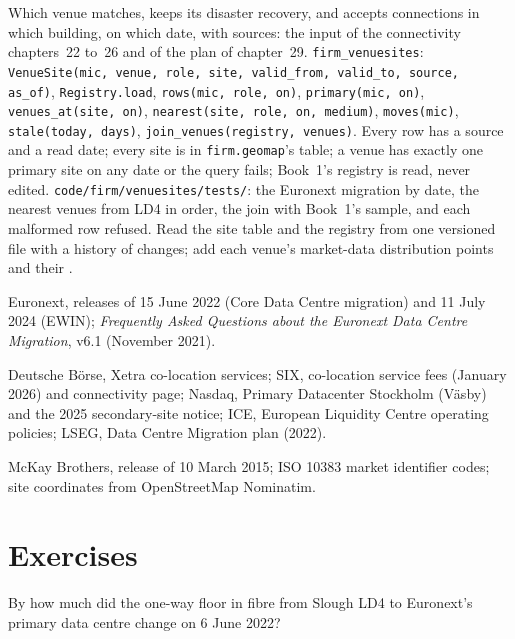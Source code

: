 \begin{build}
 Which venue matches, keeps its disaster recovery, and accepts connections in which building, on which date, with sources:
the input of the connectivity chapters~22 to~26 and of the plan of chapter~29.
 \texttt{firm\_venuesites}: \texttt{VenueSite(mic, venue, role, site, valid\_from, valid\_to, source, as\_of)},
\texttt{Registry.load}, \texttt{rows(mic, role, on)}, \texttt{primary(mic, on)}, \texttt{venues\_at(site, on)},
\texttt{nearest(site, role, on, medium)}, \texttt{moves(mic)}, \texttt{stale(today, days)}, \texttt{join\_venues(registry, venues)}.
 Every row has a source and a read date; every site is in \texttt{firm.geomap}'s table; a venue has exactly one primary site on
any date or the query fails; Book~1's registry is read, never edited.
 \texttt{code/firm/venuesites/tests/}: the Euronext migration by date, the nearest venues from LD4 in order, the
join with Book~1's sample, and each malformed row refused.
 Read the site table and the registry from one versioned file with a history of changes; add each venue's market-data
distribution points and their .
\end{build}

\begin{omsources}
\item Euronext, releases of 15 June 2022 (Core Data Centre migration) and 11 July 2024 (EWIN); \emph{Frequently Asked Questions about the
Euronext Data Centre Migration}, v6.1 (November 2021).
\item Deutsche Börse, Xetra co-location services; SIX, co-location service fees (January 2026) and connectivity page; Nasdaq, Primary
Datacenter Stockholm (Väsby) and the 2025 secondary-site notice; ICE, European Liquidity Centre operating policies; LSEG, Data Centre Migration
plan (2022).
\item McKay Brothers, release of 10 March 2015; ISO 10383 market identifier codes; site coordinates from OpenStreetMap Nominatim.
\end{omsources}

\section{Exercises}

\begin{exercise}[$\star$]\label{exo:nw:the-european-map:1}
By how much did the one-way floor in fibre from Slough LD4 to Euronext's primary data centre change on 6 June 2022?
\end{exercise}

